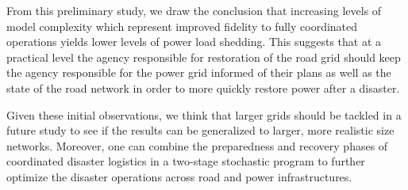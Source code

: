 \documentclass[10pt]{article}
\begin{document}
From this preliminary study, we draw the conclusion that increasing levels of model complexity which represent improved fidelity to fully coordinated operations yields lower levels of power load shedding. This suggests that at a practical level the agency responsible for restoration of the road grid should keep the agency responsible for the power grid informed of their plans as well as the state of the road network in order to more quickly restore power after a disaster.

Given these initial observations, we think that larger grids should be tackled in a future study to see if the results can be generalized to larger, more realistic size networks. Moreover, one can combine the preparedness and recovery phases of coordinated disaster logistics in a two-stage stochastic program to further optimize the disaster operations across road and power infrastructures.



\end{document}
